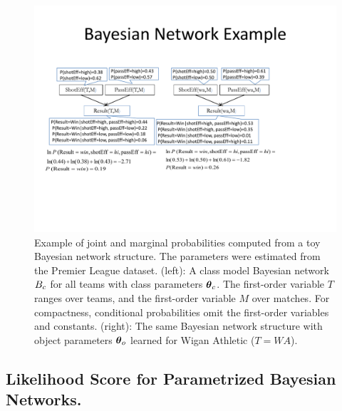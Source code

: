 {{%
 	\begin{figure}[t]
 		\centering
 		\includegraphics[width=1\textwidth] 
 		{wa.pdf}
 		\caption[Example of joint and marginal probabilities computed from a toy Bayesian network structure. ]{Example of joint and marginal probabilities computed from a toy Bayesian network structure. The parameters were estimated from the  Premier League dataset. (left): A class model Bayesian network $B_{c}$ for all teams with class parameters $\boldsymbol{\theta}_{c}$. The first-order variable $T$ ranges over teams, and the first-order variable $M$ over matches. For compactness, conditional probabilities omit the first-order variables and constants. (right): The same Bayesian network structure with object parameters $\boldsymbol{\theta}_{o}$ learned for Wigan Athletic ($T = WA$). 
 			\label{fig:bns}
 		}
 	\end{figure}
			

	\subsection{Likelihood Score for Parametrized Bayesian Networks.}\label{sec:log}
	
}}

